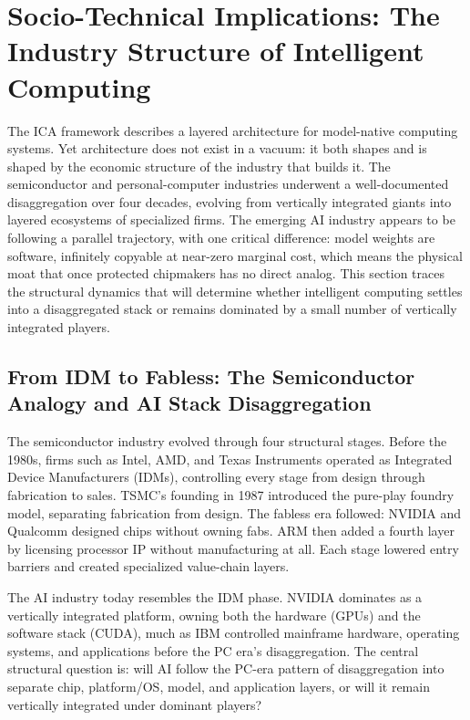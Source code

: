 \section{Socio-Technical Implications: The Industry Structure of Intelligent Computing}
\label{sec:sociotechnical}

The ICA framework describes a layered architecture for model-native computing systems. Yet architecture does not exist in a vacuum: it both shapes and is shaped by the economic structure of the industry that builds it. The semiconductor and personal-computer industries underwent a well-documented disaggregation over four decades, evolving from vertically integrated giants into layered ecosystems of specialized firms. The emerging AI industry appears to be following a parallel trajectory, with one critical difference: model weights are software, infinitely copyable at near-zero marginal cost, which means the physical moat that once protected chipmakers has no direct analog. This section traces the structural dynamics that will determine whether intelligent computing settles into a disaggregated stack or remains dominated by a small number of vertically integrated players.

\subsection{From IDM to Fabless: The Semiconductor Analogy and AI Stack Disaggregation}
\label{sec:idm-fabless}

The semiconductor industry evolved through four structural stages. Before the 1980s, firms such as Intel, AMD, and Texas Instruments operated as Integrated Device Manufacturers (IDMs), controlling every stage from design through fabrication to sales. TSMC's founding in 1987 introduced the pure-play foundry model, separating fabrication from design. The fabless era followed: NVIDIA and Qualcomm designed chips without owning fabs. ARM then added a fourth layer by licensing processor IP without manufacturing at all. Each stage lowered entry barriers and created specialized value-chain layers.

The AI industry today resembles the IDM phase. NVIDIA dominates as a vertically integrated platform, owning both the hardware (GPUs) and the software stack (CUDA), much as IBM controlled mainframe hardware, operating systems, and applications before the PC era's disaggregation. The central structural question is: will AI follow the PC-era pattern of disaggregation into separate chip, platform/OS, model, and application layers, or will it remain vertically integrated under dominant players?

